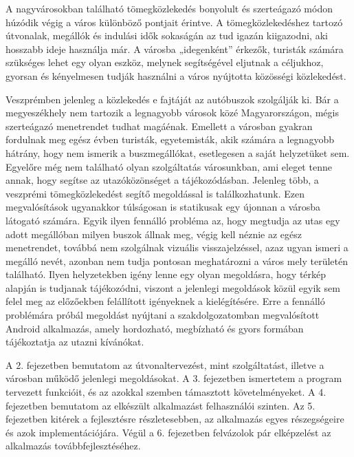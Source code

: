 
A nagyvárosokban található tömegközlekedés bonyolult és szerteágazó módon húzódik végig a város különböző pontjait érintve. 
A tömegközlekedéshez tartozó útvonalak, megállók és indulási idők sokaságán az tud igazán kiigazodni, aki hosszabb ideje használja már. 
A városba „idegenként” érkezők, turisták számára szükséges lehet egy olyan eszköz, melynek segítségével eljutnak a céljukhoz, gyorsan és kényelmesen tudják használni a város nyújtotta közösségi közlekedést. 

Veszprémben jelenleg a közlekedés e fajtáját az autóbuszok szolgálják ki. 
Bár a megyeszékhely nem tartozik a legnagyobb városok közé Magyarországon, mégis szerteágazó menetrendet tudhat magáénak. 
Emellett a városban gyakran fordulnak meg egész évben turisták, egyetemisták, akik számára a legnagyobb hátrány, hogy nem ismerik a buszmegállókat, esetlegesen a saját helyzetüket sem. 
Egyelőre még nem található olyan szolgáltatás városunkban, ami eleget tenne annak, hogy segítse az utazóközönséget a tájékozódásban.
Jelenleg több, a veszprémi tömegközlekedést segítő megoldással is találkozhatunk. 
Ezen megvalósítások ugyanakkor túlságosan is statikusak egy újonnan a városba látogató számára. 
Egyik ilyen fennálló probléma az, hogy megtudja az utas egy adott megállóban milyen buszok állnak meg, végig kell néznie az egész menetrendet, továbbá nem szolgálnak vizuális visszajelzéssel, azaz ugyan ismeri a megálló nevét, azonban nem tudja pontosan meghatározni a város mely területén található. 
Ilyen helyzetekben igény lenne egy olyan megoldásra, hogy térkép alapján is tudjanak tájékozódni, viszont a jelenlegi megoldások közül egyik sem felel meg az előzőekben felállított igényeknek a kielégítésére.
Erre a fennálló problémára próbál megoldást nyújtani a szakdolgozatomban megvalósított Android alkalmazás, amely hordozható, megbízható és gyors formában tájékoztatja az utazni kívánókat. 

A 2. fejezetben bemutatom az útvonaltervezést, mint szolgáltatást, illetve a városban működő jelenlegi megoldásokat. 
A 3. fejezetben ismertetem a program tervezett funkcióit, és az azokkal szemben támasztott követelményeket.
A 4. fejezetben bemutatom az elkészült alkalmazást felhasználói szinten.
Az 5. fejezetben kitérek a fejlesztésre részletesebben, az alkalmazás egyes részegségeire és azok implementációjára. 
Végül a 6. fejezetben felvázolok pár elképzelést az alkalmazás továbbfejlesztéséhez.
